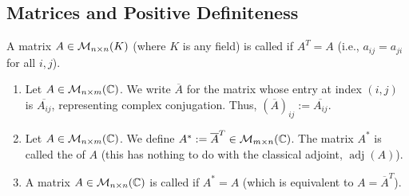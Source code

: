 \subsection{Matrices and Positive Definiteness}

\begin{definition}
    A matrix $A \in \mathcal{M}_{n \times n}(K)$ (where $K$ is any field) is called  if $A^T = A$ (i.e., $a_{ij} = a_{ji}$ for all $i,j$).
\end{definition}

\begin{definition}
    \begin{enumerate}
        \item Let $A \in \mathcal{M}_{n \times m}(\mathbb{C})$. We write $\overline{A}$ for the matrix whose entry at index $(i,j)$ is $\overline{A_{ij}}$, representing complex conjugation. Thus, $(\overline{A})_{ij} := \overline{A_{ij}}$.
        \item Let $A \in \mathcal{M}_{n \times m}(\mathbb{C})$. We define $A^* := \overline{A}^T \in \mathcal{M}_{m \times n}(\mathbb{C})$. The matrix $A^*$ is called the  of $A$ (this has nothing to do with the classical adjoint, $\operatorname{adj}(A)$).
        \item A matrix $A \in \mathcal{M}_{n \times n}(\mathbb{C})$ is called  if $A^* = A$ (which is equivalent to $A = \overline{A}^T$).
    \end{enumerate}
\end{definition}

